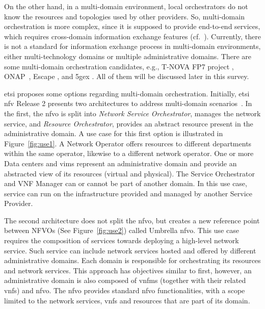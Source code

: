 On the other hand, in a multi-domain environment,  local orchestrators do not know the resources and topologies used by other providers. So, multi-domain orchestration is more complex, since it is supposed to provide end-to-end services, which requires cross-domain information exchange features (cf.~\cite{md2}).  
Currently, there is not a standard for information exchange process in multi-domain environments, either multi-technology domains or multiple administrative domains. There are some multi-domain orchestration candidates, e.g., T-NOVA FP7 project \cite{FP7projectT-NOVAT-NOVAInfrastructures}, ONAP~\cite{onap}, Escape \cite{Sonkoly2015Multi-DomainClouds}, and \gls{5gex} \cite{Bernardos20155GInfrastructures}. All of them will be discussed later in this survey.

\gls{etsi} proposes some options regarding multi-domain orchestration. Initially, \gls{etsi} \gls{nfv}  Release 2 presents two architectures to address multi-domain scenarios~\cite{ETSIIndustrySpecificationGroupISGNFV2014NetworkOptions}. In the first, the \gls{nfvo} is split into \textit{Network Service Orchestrator}, manages the network service, and \textit{Resource Orchestrator}, provides an abstract resource present in the administrative domain. A use case for this first option is illustrated in Figure~\ref{fig:use1}. A Network Operator offers resources to different departments within the same operator, likewise to a different network operator. One or more Data centers and \glspl{vim} represent an administrative domain and provide an abstracted view of its resources (virtual and physical). The Service Orchestrator and VNF Manager can or cannot be part of another domain. In this use case, service can run on the infrastructure provided and managed by another Service Provider.

The second architecture does not split the \gls{nfvo}, but creates a new reference point between NFVOs (See Figure~\ref{fig:use2}) called  Umbrella \gls{nfvo}. This use case requires the composition of services towards deploying a high-level network service. Such service can include network services hosted and offered by different administrative domains. Each domain is responsible for orchestrating its resources and network services. This approach has objectives similar to first, however, an administrative domain is also composed of \glspl{vnfm} (together with their related \glspl{vnf}) and \gls{nfvo}. The \gls{nfvo} provides standard \gls{nfvo} functionalities, with a scope limited to the network services, \glspl{vnf} and resources that are part of its domain.

